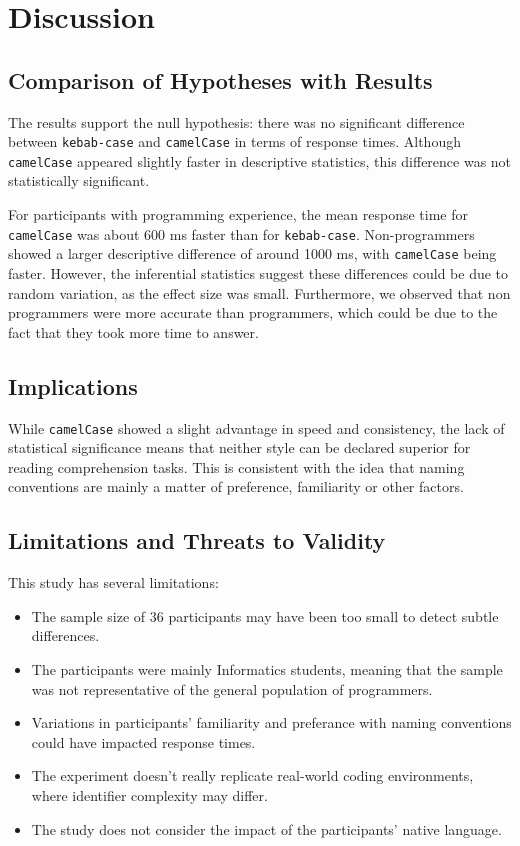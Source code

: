 \documentclass[unicode,11pt,a4paper,oneside,numbers=endperiod,openany]{scrartcl}
\begin{document}
\section{Discussion}
\subsection{Comparison of Hypotheses with Results}
The results support the null hypothesis: there was no significant difference between \texttt{kebab-case} and \texttt{camelCase} in terms of response times. Although \texttt{camelCase} appeared slightly faster in descriptive statistics, this difference was not statistically significant.

For participants with programming experience, the mean response time for \texttt{camelCase} was about 600 ms faster than for \texttt{kebab-case}. Non-programmers showed a larger descriptive difference of around 1000 ms, with \texttt{camelCase} being faster. However, the inferential statistics suggest these differences could be due to random variation, as the effect size was small. Furthermore, we observed that non programmers were more accurate than programmers, which could be due to the fact that they took more time to answer.
\subsection{Implications}
While \texttt{camelCase} showed a slight advantage in speed and consistency, the lack of statistical significance means that neither style can be declared superior for reading comprehension tasks. This is consistent with the idea that naming conventions are mainly a matter of preference, familiarity or other factors. 

\subsection{Limitations and Threats to Validity}
This study has several limitations:
\begin{itemize}
    \item The sample size of 36 participants may have been too small to detect subtle differences.
    \item The participants were mainly Informatics students, meaning that the sample was not representative of the general population of programmers.
    \item Variations in participants' familiarity and preferance with naming conventions could have impacted response times.
    \item The experiment doesn't really replicate real-world coding environments, where identifier complexity may differ.
    \item The study does not consider the impact of the participants' native language.
\end{itemize}
\end{document}
